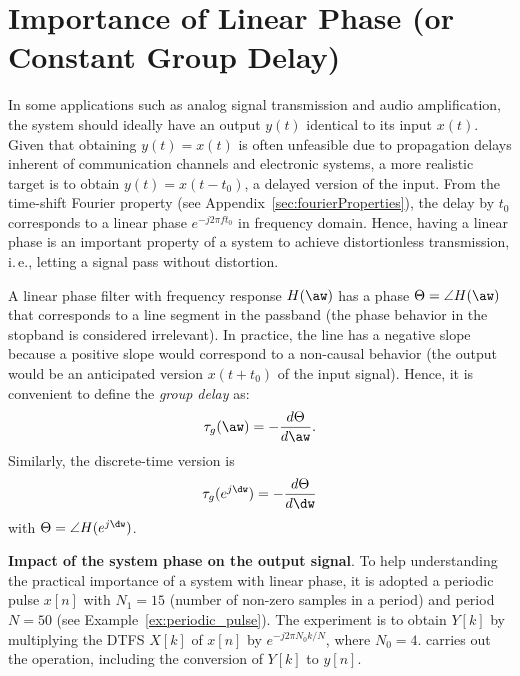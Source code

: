 \section{Importance of Linear Phase (or Constant Group Delay)}

In some applications such as analog signal transmission and audio amplification, the system 
should ideally have an output $y(t)$ identical to its input $x(t)$. Given that obtaining 
$y(t)=x(t)$ is often unfeasible due to propagation delays inherent of communication channels and
electronic systems, a more realistic target is to obtain $y(t)=x(t-t_0)$, a delayed version of
the input. From the time-shift Fourier property (see Appendix~\ref{sec:fourierProperties}), the
delay by $t_0$ corresponds to a linear phase $e^{-j 2 \pi f t_0}$ in frequency domain. Hence,
having a linear phase is an important property of a system to achieve distortionless transmission, i.\,e., letting a signal pass without distortion.

A linear phase filter with frequency response $H(\aw)$ has a phase $\Theta = \angle{H(\aw)}$  that corresponds to a line segment in the passband (the phase behavior in the stopband is considered irrelevant). In practice, the line has a negative slope because a positive slope would correspond to a non-causal behavior (the output would be an anticipated version $x(t+t_0)$ of the input signal). 
Hence, it is convenient to define the \emph{group delay} as:
\begin{equation}
\tau_g(\aw) = - \frac{d \Theta}{d \aw}.
\label{eq:groupDelay}
\end{equation}
Similarly, the discrete-time version is
\begin{equation}
\tau_g(e^{j\dw}) = - \frac{d \Theta}{d \dw}
\label{eq:discreteTimeGroupDelay}
\end{equation}
with $\Theta = \angle{H(e^{j\dw})}$. 

\bExample \textbf{Impact of the system phase on the output signal}.
To help understanding the practical importance of a system with linear phase, it is adopted a periodic pulse $x[n]$ with $N_1=15$ (number of non-zero samples in a period) and period $N=50$ (see Example~\ref{ex:periodic_pulse}). The experiment is to obtain $Y[k]$ by multiplying the DTFS $X[k]$ of $x[n]$ by $e^{-j 2\pi N_0 k/ N}$, where $N_0=4$.  carries out the operation, including the conversion of $Y[k]$ to $y[n]$.

